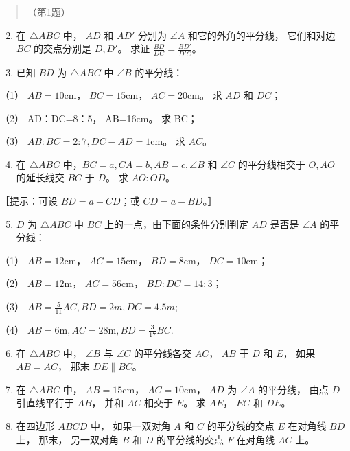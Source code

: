 \begin{quote}
（第1题）
\end{quote}

\begin{enumerate}
\setcounter{enumi}{1}
\item
  在 \(\triangle ABC\) 中， \(AD\) 和 \(AD'\) 分别为 \(\angle A\)
  和它的外角的平分线， 它们和对边 \(BC\) 的交点分别是 \(D, D'\)。 求证
  \(\frac{BD}{DC} = \frac{BD'}{D'C}\)。
\item
  已知 \(BD\) 为 \(\triangle ABC\) 中 \(\angle B\) 的平分线：
\end{enumerate}

（1） \(AB = 10\mathrm{cm}\)， \(BC = 15\mathrm{cm}\)，
\(AC = 20\mathrm{cm}\)。 求 \(AD\) 和 \(DC\)；

（2） AD：DC=8：5， AB=16cm。 求 BC；

（3） \(AB:BC = 2:7, DC - AD = 1\mathrm{cm}\)。 求 \(AC\)。

\begin{enumerate}
\setcounter{enumi}{3}
\item
  在 \(\triangle ABC\) 中，\(BC = a, CA = b, AB = c, \angle B\) 和
  \(\angle C\) 的平分线相交于 \(O, AO\) 的延长线交 \(BC\) 于 \(D\)。 求
  \(AO:OD\)。
\end{enumerate}

［提示：可设 \(BD = a - CD\)；或 \(CD = a - BD\)。］

\begin{enumerate}
\setcounter{enumi}{4}
\item
  \(D\) 为 \(\triangle ABC\) 中 \(BC\) 上的一点，由下面的条件分别判定
  \(AD\) 是否是 \(\angle A\) 的平分线：
\end{enumerate}

（1） \(AB = 12\mathrm{cm}\)， \(AC = 15\mathrm{cm}\)，
\(BD = 8\mathrm{cm}\)， \(DC = 10\mathrm{cm}\)；

（2） \(AB = 12\mathrm{m}\)， \(AC = 56\mathrm{cm}\)，
\(BD:DC = 14:3\)；

（3） \(AB = \frac{5}{11} AC, BD = 2m, DC = 4.5m;\)

（4） \(AB = 6\mathrm{m}, AC = 28\mathrm{m}, BD = \frac{3}{17} BC.\)

\begin{enumerate}
\setcounter{enumi}{5}
\item
  在 \(\triangle ABC\) 中， \(\angle B\) 与 \(\angle C\) 的平分线各交
  \(AC\)， \(AB\) 于 \(D\) 和 \(E\)， 如果 \(AB = AC\)， 那末
  \(DE \parallel BC\)。
\item
  在 \(\triangle ABC\) 中， \(AB = 15\mathrm{cm}\)，
  \(AC = 10\mathrm{cm}\)， \(AD\) 为 \(\angle A\) 的平分线， 由点 \(D\)
  引直线平行于 \(AB\)， 并和 \(AC\) 相交于 \(E\)。 求 \(AE\)， \(EC\) 和
  \(DE\)。
\item
  在四边形 \(ABCD\) 中， 如果一双对角 \(A\) 和 \(C\) 的平分线的交点
  \(E\) 在对角线 \(BD\) 上， 那末， 另一双对角 \(B\) 和 \(D\)
  的平分线的交点 \(F\) 在对角线 \(AC\) 上。
\end{enumerate}

